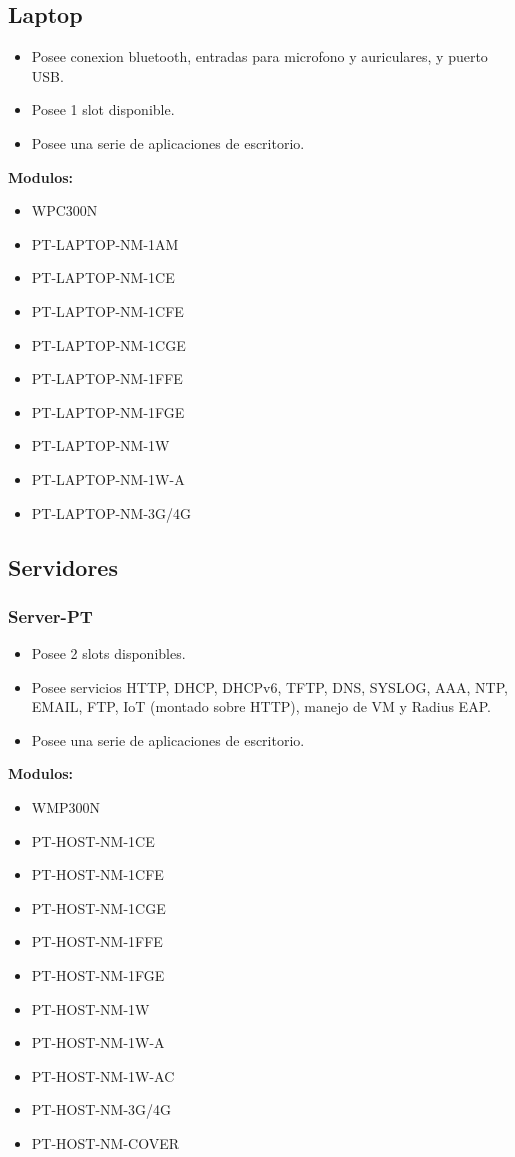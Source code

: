 \documentclass{article}
\begin{document}
\subsection{Laptop}
\begin{itemize}
    \item Posee conexion bluetooth, entradas para microfono y auriculares, y puerto USB.
    \item Posee 1 slot disponible.
    \item Posee una serie de aplicaciones de escritorio.
\end{itemize}

\textbf{Modulos:}
\begin{itemize}
    \item WPC300N
    \item PT-LAPTOP-NM-1AM
    \item PT-LAPTOP-NM-1CE
    \item PT-LAPTOP-NM-1CFE
    \item PT-LAPTOP-NM-1CGE
    \item PT-LAPTOP-NM-1FFE
    \item PT-LAPTOP-NM-1FGE
    \item PT-LAPTOP-NM-1W
    \item PT-LAPTOP-NM-1W-A
    \item PT-LAPTOP-NM-3G/4G
\end{itemize}

\subsection{Servidores}

\subsubsection{Server-PT}
\begin{itemize}
    \item Posee 2 slots disponibles.
    \item Posee servicios HTTP, DHCP, DHCPv6, TFTP, DNS, SYSLOG, AAA, NTP, EMAIL, FTP, IoT (montado sobre HTTP), manejo de VM y Radius EAP.
    \item Posee una serie de aplicaciones de escritorio.
\end{itemize}
\textbf{Modulos:}
\begin{itemize}
    \item WMP300N
    \item PT-HOST-NM-1CE
    \item PT-HOST-NM-1CFE
    \item PT-HOST-NM-1CGE
    \item PT-HOST-NM-1FFE
    \item PT-HOST-NM-1FGE
    \item PT-HOST-NM-1W
    \item PT-HOST-NM-1W-A
    \item PT-HOST-NM-1W-AC
    \item PT-HOST-NM-3G/4G
    \item PT-HOST-NM-COVER
\end{itemize}
\end{document}
